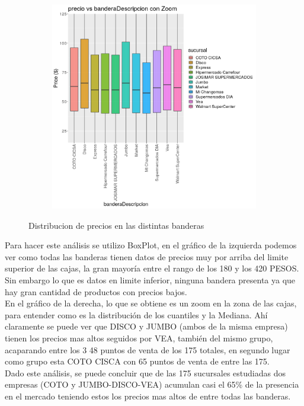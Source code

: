 \begin{figure}[h]
\begin{subfigure}{.5\textwidth}
  \includegraphics[width=0.4\paperwidth, height=0.4\paperheight, keepaspectratio]{img/precio_vs_bandera_zoom.png}
\end{subfigure}
\caption{Distribucion de precios en las distintas banderas}
\label{fig:test}
\end{figure}


Para hacer este análisis se utilizo BoxPlot, en el gráfico de la izquierda podemos ver como todas las banderas tienen datos de precios muy por arriba del limite superior de las cajas, la gran mayoría entre el rango de los 180 y los 420 PESOS. Sin embargo lo que es datos en limite inferior, ninguna bandera presenta ya que hay gran cantidad de productos con precios bajos.\\
En el gráfico de la derecha, lo que se obtiene es un zoom en la zona de las cajas, para entender como es la distribución de los cuantiles y la Mediana. Ahí claramente se puede ver que DISCO y JUMBO (ambos de la misma empresa) tienen los precios mas altos seguidos por VEA, también del mismo grupo, acaparando entre los 3 
48 puntos de venta de los 175 totales, en segundo lugar como grupo esta COTO CISCA con 65 puntos de venta de entre las 175.\\
Dado este análisis, se puede concluir que de las 175 sucursales estudiadas dos empresas (COTO y JUMBO-DISCO-VEA) acumulan casi el 65\% de la presencia en el mercado teniendo estos los precios mas altos de entre todas las banderas.\\



